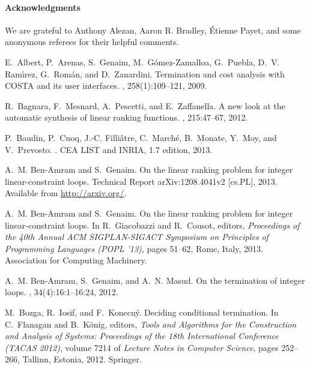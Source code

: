 \documentclass{acm_proc_article-sp}
\begin{document}
\paragraph{Acknowledgments}
We are grateful to Anthony Alezan, Aaron R. Bradley, \'Etienne Payet,
and some anonymous referees for their helpful comments.



\begin{thebibliography}{10}

E.~Albert, P.~Arenas, S.~Genaim, M.~G{\'o}mez-Zamalloa, G.~Puebla, D.~V.
  Ram\'{\i}rez, G.~Rom{\'a}n, and D.~Zanardini.
\newblock Termination and cost analysis with {COSTA} and its user interfaces.
,
  258(1):109--121, 2009.

R.~Bagnara, F.~Mesnard, A.~Pescetti, and E.~Zaffanella.
\newblock A new look at the automatic synthesis of linear ranking functions.
, 215:47--67, 2012.

P.~Baudin, P.~Cuoq, J.-C. Filli\^{a}tre, C.~March\'{e}, B.~Monate, Y.~Moy, and
  V.~Prevosto.
.
\newblock CEA LIST and INRIA, 1.7 edition, 2013.

A.~M. Ben-Amram and S.~Genaim.
\newblock On the linear ranking problem for integer linear-constraint loops.
\newblock Technical Report arXiv:1208.4041v2 [cs.PL], 2013.
\newblock Available from \url{http://arxiv.org/}.

A.~M. Ben-Amram and S.~Genaim.
\newblock On the linear ranking problem for integer linear-constraint loops.
\newblock In R.~Giacobazzi and R.~Cousot, editors, {\em Proceedings of the 40th
  Annual ACM SIGPLAN-SIGACT Symposium on Principles of Programming Languages
  (POPL '13)}, pages 51--62, Rome, Italy, 2013. Association for Computing
  Machinery.

A.~M. Ben-Amram, S.~Genaim, and A.~N. Masud.
\newblock On the termination of integer loops.
,
  34(4):16:1--16:24, 2012.

M.~Bozga, R.~Iosif, and F.~Konecn{\'y}.
\newblock Deciding conditional termination.
\newblock In C.~Flanagan and B.~K{\"o}nig, editors, {\em Tools and Algorithms
  for the Construction and Analysis of Systems: Proceedings of the 18th
  International Conference (TACAS 2012)}, volume 7214 of {\em Lecture Notes in
  Computer Science}, pages 252--266, Tallinn, Estonia, 2012. Springer.


\end{thebibliography}
\end{document}
